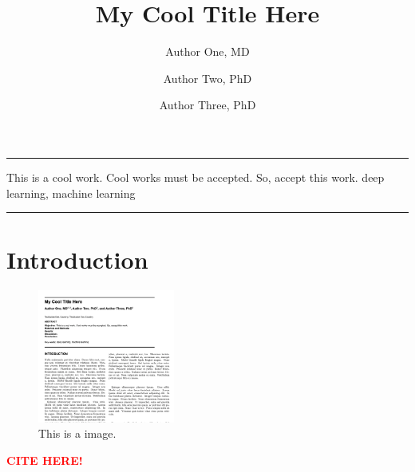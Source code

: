 \documentclass[twocolumn, 8pt]{article}
\title{My Cool Title Here}
\author[1, 2]{Author One, MD}
\author[2]{Author Two, PhD}
\author[1]{Author Three, PhD}
\affil[1]{Institution One, Country;}
\affil[2]{Institution Two, Country}
\date{}
\begin{document}
\par\noindent\rule[-7pt]{15.5cm}{0.2em}
\begin{strip}
    \begin{minipage}{.88\textwidth}
        \maketitle
        \small
        \abstractSection
        {This is a cool work. Cool works must be accepted. So, accept this work.} %
        {} %
        {} %
        {} %
        {} %
        {deep learning, machine learning} %
        
        \par\noindent\rule[-7pt]{15.5cm}{0.2em}
        \hspace{2cm}
    \end{minipage}
\end{strip}


\section*{Introduction}

\begin{figure}
    \centering
    \setlength{\abovecaptionskip}{0pt}
    \includegraphics[width=0.4\textwidth]{build/example.png}
    \caption{This is a image.}
    \label{fig::local_pred_model}
\end{figure}

\lipsum[3-8] \cite{he2016deep} \textcolor{red}{\textbf{CITE HERE!}}
\end{document}
